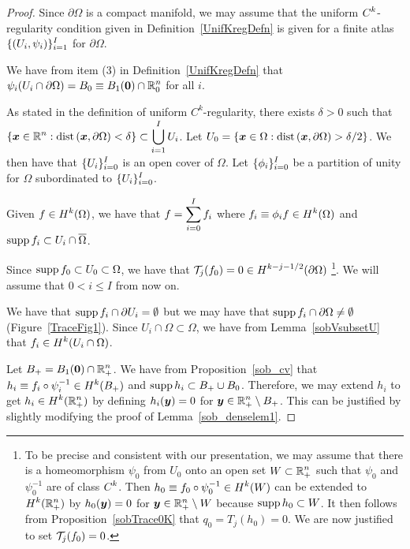 \begin{proof}
Since $\partial \Omega$ is a compact manifold, we may assume that
the uniform $\displaystyle C^k$-regularity condition given in
Definition~\ref{UnifKregDefn} is given for a finite atlas
$\displaystyle \{ (U_i,\psi_i) \}_{i=1}^I$ for $\partial \Omega$.

We have from item (3) in Definition~\ref{UnifKregDefn} that
$\displaystyle \psi_i(U_i \cap \partial \Omega)
= B_0 \equiv B_1({\bm{0}}) \cap \mathbb{R}^n_0$ for all $i$.

As stated in the definition of uniform $C^k$-regularity, there exists
$\delta>0$ such that\\
$\displaystyle \left\{ {\bm{x}} \in \mathbb{R}^n :
\mathrm{dist}\left({\bm{x}},\partial \Omega\right)  < \delta \right\} \subset
\bigcup_{i=1}^I U_i$.
Let $\displaystyle U_0 = \left\{ {\bm{x}} \in \Omega :
\mathrm{dist}\left({\bm{x}},\partial \Omega\right)  > \delta/2 \right\}$.
We then have that $\displaystyle \{ U_i \}_{i=0}^I$ is an open cover of
$\Omega$.
Let $\displaystyle \{ \phi_i \}_{i=0}^I$ be a partition of unity for
$\Omega$ subordinated to $\displaystyle \{ U_i \}_{i=0}^I$.

Given $\displaystyle f \in H^k(\Omega)$, we have that
$\displaystyle f = \sum_{i=0}^I f_i$ where
$\displaystyle f_i \equiv \phi_i f \in H^k(\Omega)$ and
$\operatorname{supp} f_i \subset U_i \cap \overline{\Omega}$.

Since $\operatorname{supp} f_0 \subset U_0 \subset \Omega$, we have that
$\displaystyle \mathcal{T}_j(f_0) = 0 \in H^{k-j-1/2}(\partial \Omega)$
\footnote{To be precise and consistent with our presentation, we may
assume that there is a homeomorphism $\psi_0$ from $U_0$ onto an open
set $\displaystyle W \subset \mathbb{R}^n_+$ such that $\psi_0$ and
$\psi_0^{-1}$ are of class $\displaystyle C^k$.  Then
$\displaystyle h_0 \equiv f_0 \circ \psi_0^{-1} \in H^k(W)$
can be extended to $\displaystyle H^k(\mathbb{R}_+^n)$ by
$h_0({\bm{y}}) = 0$ for ${\bm{y}} \in \mathbb{R}_+^n \setminus W$
because $\displaystyle \operatorname{supp} h_0 \subset W$.
It then follows from Proposition~\ref{sobTrace0K} that $q_0 = T_j(h_0) = 0$.
We are now justified to set $\mathcal{T}_j(f_0) = 0$.}.
We will assume that $0<i\leq I$ from now on.

We have that $\operatorname{supp} f_i \cap \partial U_i = \emptyset$ but we may have that
$\operatorname{supp} f_i \cap \partial \Omega \neq \emptyset$ (Figure~\ref{TraceFig1}).
Since $U_i \cap \Omega \subset \Omega$, we have from
Lemma~\ref{sobVsubsetU} that $\displaystyle f_i \in H^k(U_i \cap \Omega)$.

Let $\displaystyle B_+ = B_1({\bm{0}}) \cap \mathbb{R}^n_+$.
We have from Proposition~\ref{sob_cv} that
$\displaystyle h_i \equiv f_i \circ \psi_i^{-1} \in H^k(B_+)$ and
$\displaystyle \operatorname{supp} h_i \subset B_+ \cup B_0$.  Therefore, we may
extend $h_i$ to get $\displaystyle h_i \in H^k(\mathbb{R}^n_+)$ by defining
$h_i({\bm{y}}) = 0$ for $\displaystyle {\bm{y}} \in \mathbb{R}^n_+ \setminus B_+$.
This can be justified by slightly modifying the proof of
Lemma~\ref{sob_denselem1}.


\end{proof}
